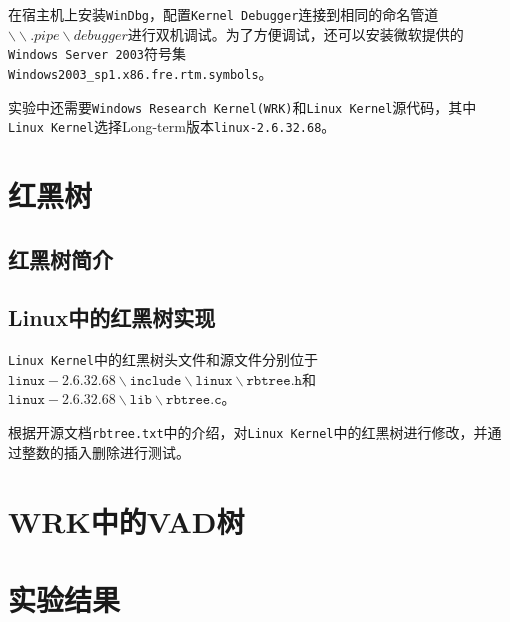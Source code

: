 \documentclass[a4paper, 11pt]{article}
\begin{document}
        在宿主机上安装\texttt{WinDbg}，配置\texttt{Kernel Debugger}连接到相同的命名管道$\backslash\backslash.pipe\backslash debugger$进行双机调试。为了方便调试，还可以安装微软提供的
        \texttt{Windows Server 2003}符号集\\
        \texttt{Windows2003\_sp1.x86.fre.rtm.symbols}。
        
        实验中还需要\texttt{Windows Research Kernel(WRK)}和\texttt{Linux Kernel}源代码，其中\texttt{Linux Kernel}选择Long-term版本\texttt{linux-2.6.32.68}。
        
    \section{红黑树}
        \subsection{红黑树简介}
        
        \subsection{Linux中的红黑树实现}
            \texttt{Linux Kernel}中的红黑树头文件和源文件分别位于 \\
            $\mathtt{linux-2.6.32.68\backslash include \backslash linux \backslash rbtree.h}$和 \\
            $\mathtt{linux-2.6.32.68 \backslash lib \backslash rbtree.c}$。
            
            根据开源文档\texttt{rbtree.txt}\cite{rbtreetxt}中的介绍，对\texttt{Linux Kernel}中的红黑树进行修改，并通过整数的插入删除进行测试。
    
    \section{WRK中的VAD树}
    
    \section{实验结果}
    
    
    
\end{document}
